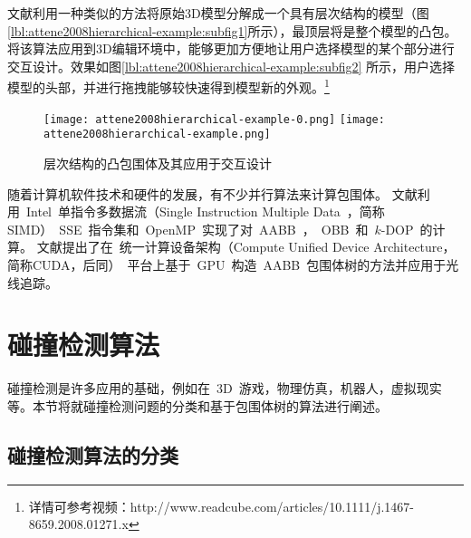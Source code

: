 文献\cite{attene2008hierarchical}利用一种类似的方法将原始3D模型分解成一个具有层次结构的模型（图\ref{lbl:attene2008hierarchical-example:subfig1}所示），最顶层将是整个模型的凸包。将该算法应用到3D编辑环境中，能够更加方便地让用户选择模型的某个部分进行交互设计。效果如图\ref{lbl:attene2008hierarchical-example:subfig2} 所示，用户选择模型的头部，并进行拖拽能够较快速得到模型新的外观。\footnote{详情可参考视频：http://www.readcube.com/articles/10.1111/j.1467-8659.2008.01271.x }

\begin{figure}[H]
  \centering
    {\texttt{[image: attene2008hierarchical-example-0.png]}}
    {\texttt{[image: attene2008hierarchical-example.png]}}
  \caption{层次结构的凸包围体及其应用于交互设计\cite{attene2008hierarchical}}
  \label{lbl:attene2008hierarchical-example}
\end{figure}

随着计算机软件技术和硬件的发展，有不少并行算法来计算包围体。
文献\cite{karlsson2010parallel}利用~Intel~单指令多数据流（Single Instruction
Multiple Data~，简称SIMD）~SSE~指令集和~OpenMP~实现了对~AABB~，~OBB~和~$k$-DOP~的计算。
文献\cite{lauterbach2009fast}提出了在~统一计算设备架构（Compute Unified Device
Architecture，简称CUDA，后同）~平台上基于~GPU~构造~AABB~包围体树的方法并应用于光线追踪。

\section{碰撞检测算法}
\label{sec:collisiondetection}

碰撞检测是许多应用的基础，例如在~3D~游戏，物理仿真，机器人，虚拟现实等。本节将就碰撞检测问题的分类和基于包围体树的算法进行阐述。

\subsection{碰撞检测算法的分类}
\label{sec:cd-category}

